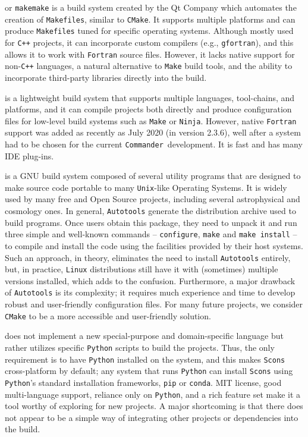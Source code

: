 \documentclass[twocolumn]{aa}
\def\commander{\texttt{Commander}}
\begin{document}
 or \texttt{makemake} is a build system created by the Qt Company which automates the creation of \texttt{Makefiles}, similar to \texttt{CMake}. It supports multiple platforms and can produce \texttt{Makefiles} tuned for specific operating systems. Although mostly used for \texttt{C++} projects, it can incorporate custom compilers (e.g., \texttt{gfortran}), and this allows it to work with \texttt{Fortran} source files. However, it lacks native support for non-\texttt{C++} languages, a natural alternative to \texttt{Make} build tools, and the ability to incorporate third-party libraries directly into the build.

 is a lightweight build system that supports multiple languages, tool-chains, and platforms, and it can compile projects both directly and produce configuration files for low-level build systems such as \texttt{Make} or \texttt{Ninja}. However, native \texttt{Fortran} support was added as recently as July 2020 (in version 2.3.6), well after a system had to be chosen for the current \commander\ development. It is fast and has many IDE plug-ins.

 is a GNU build system composed of several utility programs that are designed to make source code portable to many \texttt{Unix}-like Operating Systems. It is widely used by many free and Open Source projects, including several astrophysical and cosmology ones. In general, \texttt{Autotools} generate the distribution archive used to build programs. Once users obtain this package, they need to unpack it and run three simple and well-known commands -- \texttt{configure}, \texttt{make} and \texttt{make install} -- to compile and install the code using the facilities provided by their host systems. Such an approach, in theory, eliminates the need to install \texttt{Autotools} entirely, but, in practice, \texttt{Linux} distributions still have it with (sometimes) multiple versions installed, which adds to the confusion. Furthermore, a major drawback of \texttt{Autotools} is its complexity; it requires much experience and time to develop robust and user-friendly configuration files. For many future projects, we consider \texttt{CMake} to be a more accessible and user-friendly solution.

 does not implement a new special-purpose and domain-specific language but rather utilizes specific \texttt{Python} scripts to build the projects. Thus, the only requirement is to have \texttt{Python} installed on the system, and this makes \texttt{Scons} cross-platform by default; any system that runs \texttt{Python} can install \texttt{Scons} using \texttt{Python}'s standard installation frameworks, \texttt{pip} or \texttt{conda}. MIT license, good multi-language support, reliance only on \texttt{Python}, and a rich feature set make it a tool worthy of exploring for new projects. A major shortcoming is that there does not appear to be a simple way of integrating other projects or dependencies into the build.
\end{document}
